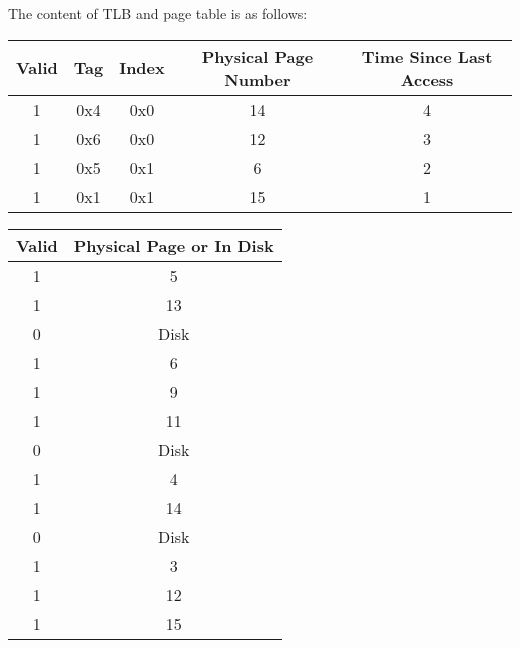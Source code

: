 \documentclass[a4paper,12pt]{article}
\begin{document}
The content of TLB and page table is as follows:

\begin{table}[H]
	\centering
	\begin{tabular}{ccccc}
		\toprule
		Valid & Tag & Index & Physical Page Number & Time Since Last Access \\
		\midrule
		1 & 0x4 & 0x0 & 14 & 4 \\
		1 & 0x6 & 0x0 & 12 & 3 \\
		1 & 0x5 & 0x1 & 6 & 2 \\
		1 & 0x1 & 0x1 & 15 & 1 \\
		\bottomrule
	\end{tabular}
\end{table}

\begin{table}[H]
	\centering
	\begin{tabular}{cc}
		\toprule
		Valid & Physical Page or In Disk \\
		\midrule
		1 & 5 \\
		1 & 13 \\
		0 & Disk \\
		1 & 6 \\
		1 & 9 \\
		1 & 11 \\
		0 & Disk \\
		1 & 4 \\
		1 & 14 \\
		0 & Disk \\
		1 & 3 \\
		1 & 12 \\
		1 & 15 \\
		\bottomrule
	\end{tabular}
\end{table}
\end{document}
